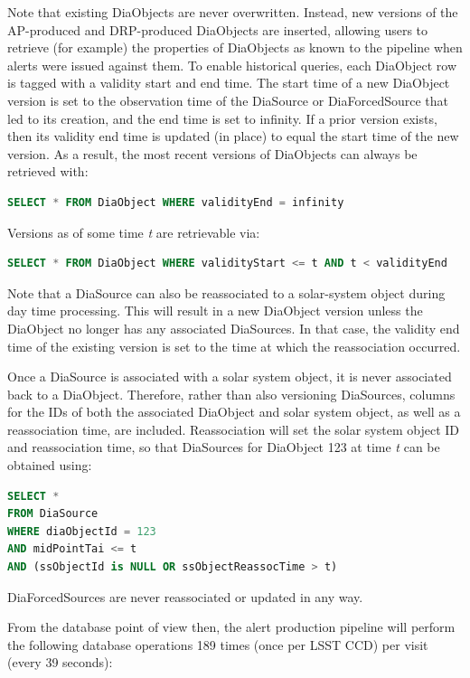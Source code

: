 \documentclass[DM,lsstdraft,toc]{lsstdoc}
\begin{document}
Note that existing DiaObjects are never overwritten. Instead, new
versions of the AP-produced and DRP-produced DiaObjects are inserted,
allowing users to retrieve (for example) the properties of DiaObjects as
known to the pipeline when alerts were issued against them. To enable
historical queries, each DiaObject row is tagged with a validity start
and end time. The start time of a new DiaObject version is set to the
observation time of the DiaSource or DiaForcedSource that led to its
creation, and the end time is set to infinity. If a prior version
exists, then its validity end time is updated (in place) to equal the
start time of the new version. As a result, the most recent versions of
DiaObjects can always be retrieved with:

\begin{lstlisting}[language=SQL]
SELECT * FROM DiaObject WHERE validityEnd = infinity
\end{lstlisting}

Versions as of some time \emph{t} are retrievable via:

\begin{lstlisting}[language=SQL]
SELECT * FROM DiaObject WHERE validityStart <= t AND t < validityEnd
\end{lstlisting}

Note that a DiaSource can also be reassociated to a solar-system object
during day time processing. This will result in a new DiaObject version
unless the DiaObject no longer has any associated DiaSources. In that
case, the validity end time of the existing version is set to the time
at which the reassociation occurred.

Once a DiaSource is associated with a solar system object, it is never
associated back to a DiaObject. Therefore, rather than also versioning
DiaSources, columns for the IDs of both the associated DiaObject and
solar system object, as well as a reassociation time, are included.
Reassociation will set the solar system object ID and reassociation
time, so that DiaSources for DiaObject 123 at time \emph{t} can be
obtained using:

\begin{lstlisting}[language=SQL]
SELECT *
FROM DiaSource
WHERE diaObjectId = 123
AND midPointTai <= t
AND (ssObjectId is NULL OR ssObjectReassocTime > t)
\end{lstlisting}

DiaForcedSources are never reassociated or updated in any way.

From the database point of view then, the alert production pipeline will
perform the following database operations 189 times (once per LSST CCD)
per visit (every 39 seconds):
\end{document}
